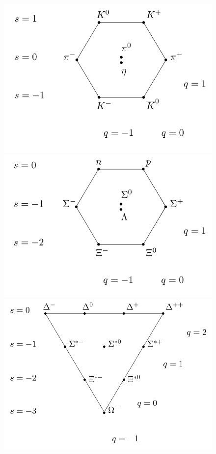 \begingroup\setlength{\intextsep}{10pt}\setlength{\columnsep}{15pt}
	
	\begin{figure}
		\vspace{-10pt}
		\begin{minipage}{\linewidth}
			\centering\captionsetup[subfigure]{justification=centering}
			\includegraphics[width=\linewidth]{fig/chapt2/Meson_octet.png}
			\subcaption{\label{fig:Eightfold:A}}
			\includegraphics[width=\linewidth]{fig/chapt2/Baryon_octet.png}
			\subcaption{\label{fig:Eightfold:B}}
			\includegraphics[width=\linewidth]{fig/chapt2/Baryon_decuplet.png}

\end{minipage}
\end{figure}
